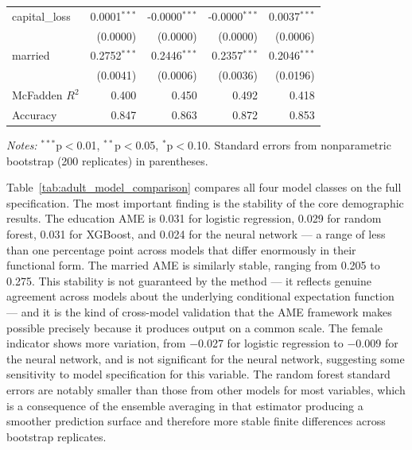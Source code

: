 \documentclass[12pt]{article}
\begin{document}
\begin{table}[htbp]
\begin{threeparttable}
\begin{tabular}{lrrrr}
				capital\_loss & 0.0001$^{***}$ & -0.0000$^{***}$ & -0.0000$^{***}$ & 0.0037$^{***}$ \\
				& (0.0000) & (0.0000) & (0.0000) & (0.0006) \\
				married & 0.2752$^{***}$ & 0.2446$^{***}$ & 0.2357$^{***}$ & 0.2046$^{***}$ \\
				& (0.0041) & (0.0006) & (0.0036) & (0.0196) \\
				\midrule
				McFadden $R^2$ & 0.400 & 0.450 & 0.492 & 0.418 \\
				Accuracy & 0.847 & 0.863 & 0.872 & 0.853 \\
				\bottomrule
			\end{tabular}
			\begin{tablenotes}
				\footnotesize
				\item \textit{Notes:} $^{***}$p$<$0.01, $^{**}$p$<$0.05, $^{*}$p$<$0.10. Standard errors from nonparametric bootstrap (200 replicates) in parentheses.
			\end{tablenotes}
		\end{threeparttable}
	\end{table}
	
	Table~\ref{tab:adult_model_comparison} compares all four model classes on the full specification. The most important finding is the stability of the core demographic results. The education AME is 0.031 for logistic regression, 0.029 for random forest, 0.031 for XGBoost, and 0.024 for the neural network --- a range of less than one percentage point across models that differ enormously in their functional form. The married AME is similarly stable, ranging from 0.205 to 0.275. This stability is not guaranteed by the method --- it reflects genuine agreement across models about the underlying conditional expectation function --- and it is the kind of cross-model validation that the AME framework makes possible precisely because it produces output on a common scale. The female indicator shows more variation, from $-$0.027 for logistic regression to $-$0.009 for the neural network, and is not significant for the neural network, suggesting some sensitivity to model specification for this variable. The random forest standard errors are notably smaller than those from other models for most variables, which is a consequence of the ensemble averaging in that estimator producing a smoother prediction surface and therefore more stable finite differences across bootstrap replicates.
	
\end{document}
